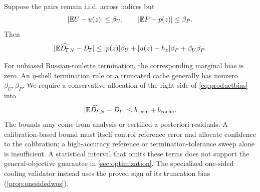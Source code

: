 \begin{proposition}
\label{prop:biaspropagation}
Suppose the pairs remain i.i.d. across indices but
\begin{equation}
 |\mathbb{E} U-u(z)|\le\beta_U,
 \qquad |\mathbb{E} P-p(z)|\le\beta_P.
 \label{eq:marginalbias}
\end{equation}
Then
\begin{equation}
 |\mathbb{E}\widehat{D_{\!T}}_N-D_{\!T}|
 \le |p(z)|\beta_U+|u(z)-h_z|\beta_P+\beta_U\beta_P.
 \label{eq:productbias}
\end{equation}
\end{proposition}

For unbiased Russian-roulette termination, the corresponding marginal bias is
zero.  An $\eta$-shell termination rule or a truncated cache generally has
nonzero $\beta_U,\beta_P$.  We require a conservative allocation of the right
side of \cref{eq:productbias} into
\begin{equation}
 |\mathbb{E}\widehat{D_{\!T}}_N-D_{\!T}|
 \le b_{\mathrm{term}}+b_{\mathrm{cache}}.
 \label{eq:biasbudget}
\end{equation}
The bounds may come from analysis or certified a posteriori residuals. A calibration-based bound must itself control reference error and allocate confidence to the calibration; a high-accuracy reference or termination-tolerance sweep alone is insufficient. A statistical interval that omits these terms does not support the general-objective guarantee in \cref{sec:optimization}. The specialized one-sided cooling validator instead uses the proved sign of its truncation bias (\cref{prop:onesidedwos}).
